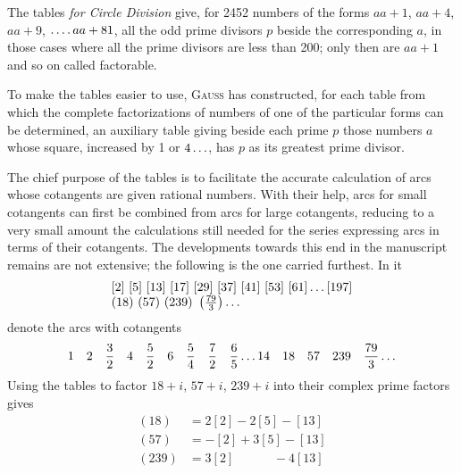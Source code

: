 \par The tables \textit{for Circle Division} give, for 2452 numbers of the forms $aa+1$, $aa+4$, $aa+9$, $\mathinner{.\,.\,.\,.} aa+81$, all the odd prime divisors $p$ beside the corresponding $a$, in those cases where all the prime divisors are less than 200; only then are $aa+1$ and so on called factorable.
\par To make the tables easier to use, \textsc{Gauss} has constructed, for each table from which the complete factorizations of numbers of one of the particular forms can be determined, an auxiliary table giving beside each prime $p$ those numbers $a$ whose square, increased by 1 or $4\mathinner{.\,.\,.}$, has $p$ as its greatest prime divisor.
\par The chief purpose of the tables is to facilitate the accurate calculation of arcs whose cotangents are given rational numbers. With their help, arcs for small cotangents can first be combined from arcs for large cotangents, reducing to a very small amount the calculations still needed for the series expressing arcs in terms of their cotangents. The developments towards this end in the manuscript remains are not extensive; the following is the one carried furthest. In it
\[
\begin{array}{l}
[2]\ [5]\ [13]\ [17]\ [29]\ [37]\ [41]\ [53]\ [61]\mathinner{.\,.\,.}[197]\\
(18)\ (57)\ (239)\ \left(\frac{79}{3}\right)\mathinner{.\,.\,.}
\end{array}
\]
denote the arcs with cotangents
\[
1\quad2\quad\frac{3}{2}\quad4\quad\frac{5}{2}\quad6\quad\frac{5}{4}\quad\frac{7}{2}\quad\frac{6}{5}\mathinner{.\,.\,.}14\quad18\quad57\quad239\quad\frac{79}{3}\mathinner{.\,.\,.}
\]
Using the tables to factor $18+i$, $57+i$, $239+i$ into their complex prime factors gives
\[
\begin{aligned}
(18)&=2[2]-2[5]-[13]\\
(57)&=-[2]+3[5]-[13]\\
(239)&=3[2]\phantom{-2[5]}-4[13]
\end{aligned}
\]
